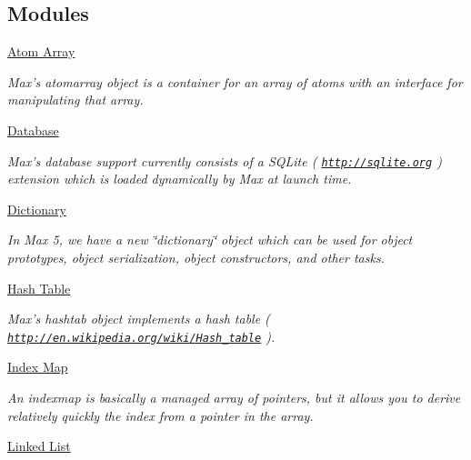 \subsection*{Modules}
\begin{DoxyCompactItemize}
\item 
\hyperlink{group__atomarray}{Atom Array}


\begin{DoxyCompactList}\small\item\em Max's atomarray object is a container for an array of atoms with an interface for manipulating that array. \item\end{DoxyCompactList}\item 
\hyperlink{group__database}{Database}


\begin{DoxyCompactList}\small\item\em Max's database support currently consists of a SQLite ( \href{http://sqlite.org}{\tt http://sqlite.org} ) extension which is loaded dynamically by Max at launch time. \item\end{DoxyCompactList}\item 
\hyperlink{group__dictionary}{Dictionary}


\begin{DoxyCompactList}\small\item\em In Max 5, we have a new \char`\"{}dictionary\char`\"{} object which can be used for object prototypes, object serialization, object constructors, and other tasks. \item\end{DoxyCompactList}\item 
\hyperlink{group__hashtab}{Hash Table}


\begin{DoxyCompactList}\small\item\em Max's hashtab object implements a hash table ( \href{http://en.wikipedia.org/wiki/Hash_table}{\tt http://en.wikipedia.org/wiki/Hash\_\-table} ). \item\end{DoxyCompactList}\item 
\hyperlink{group__indexmap}{Index Map}


\begin{DoxyCompactList}\small\item\em An indexmap is basically a managed array of pointers, but it allows you to derive relatively quickly the index from a pointer in the array. \item\end{DoxyCompactList}\item 
\hyperlink{group__linklist}{Linked List}



\end{DoxyCompactItemize}
